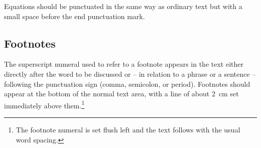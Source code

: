 \documentclass[runningheads,a4paper]{llncs}
\begin{document}
Equations should be punctuated in the same way as ordinary
text but with a small space before the end punctuation mark.

\subsection{Footnotes}

The superscript numeral used to refer to a footnote appears in the text
either directly after the word to be discussed or -- in relation to a
phrase or a sentence -- following the punctuation sign (comma,
semicolon, or period). Footnotes should appear at the bottom of
the
normal text area, with a line of about 2~cm set
immediately above them.\footnote{The footnote numeral is set flush left
and the text follows with the usual word spacing.}
\end{document}

